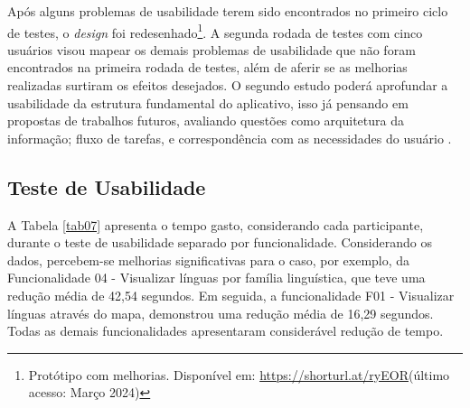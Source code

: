 Após alguns problemas de usabilidade terem sido encontrados no primeiro ciclo de testes, o \textit{design} foi redesenhado\footnote{Protótipo com melhorias. Disponível em: \url{https://shorturl.at/ryEOR}(último acesso: Março 2024)}. 
A segunda rodada de testes com cinco usuários visou mapear os demais problemas de usabilidade que não foram encontrados na primeira rodada de testes, além de aferir se as melhorias realizadas surtiram os efeitos desejados. O segundo estudo poderá aprofundar a 
usabilidade da estrutura fundamental do aplicativo, isso já pensando em propostas de trabalhos futuros, avaliando questões como arquitetura da informação; fluxo de tarefas, e correspondência com as necessidades do usuário \cite{usabilitytest}.

\subsection{Teste de Usabilidade}
\label{sec:Segundo Teste de Usabilidade}
A Tabela \ref{tab07} apresenta o tempo gasto, considerando cada participante, durante o teste de usabilidade separado por funcionalidade. Considerando os dados, percebem-se melhorias significativas para o caso, por exemplo, da Funcionalidade 04 - Visualizar línguas 
por família linguística, que teve uma redução média de 42,54 segundos. Em seguida, a funcionalidade F01 - Visualizar línguas através do mapa, demonstrou uma redução média de 16,29 segundos. Todas as demais funcionalidades apresentaram considerável redução de 
tempo. 

